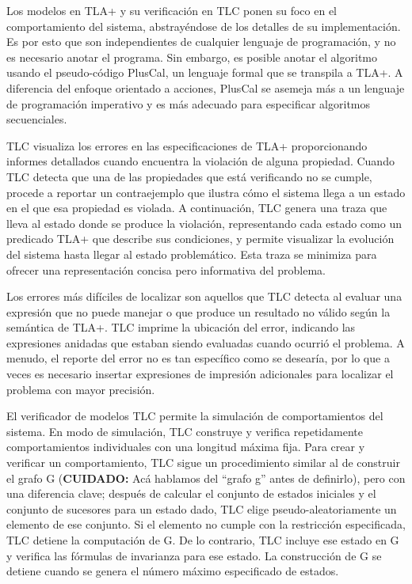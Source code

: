 \documentclass[runningheads]{llncs}
\begin{document}
Los modelos en TLA+ y su verificación en TLC ponen su foco en el comportamiento del sistema, abstrayéndose de los detalles de su implementación. Es por esto que son independientes de cualquier lenguaje de programación, y no es necesario anotar el programa. Sin embargo, es posible anotar el algoritmo usando el pseudo-código PlusCal, un lenguaje formal que se transpila a TLA+. A diferencia del enfoque orientado a acciones, PlusCal se asemeja más a un lenguaje de programación imperativo y es más adecuado para especificar algoritmos secuenciales.

TLC visualiza los errores en las especificaciones de TLA+ proporcionando informes detallados cuando encuentra la violación de alguna propiedad. Cuando TLC detecta que una de las propiedades que está verificando no se cumple, procede a reportar un contraejemplo que ilustra cómo el sistema llega a un estado en el que esa propiedad es violada. A continuación, TLC genera una traza que lleva al estado donde se produce la violación, representando cada estado como un predicado TLA+ que describe sus condiciones, y permite visualizar la evolución del sistema hasta llegar al estado problemático. Esta traza se minimiza para ofrecer una representación concisa pero informativa del problema. 

Los errores más difíciles de localizar son aquellos que TLC detecta al evaluar una expresión que no puede manejar o que produce un resultado no válido según la semántica de TLA+. TLC imprime la ubicación del error, indicando las expresiones anidadas que estaban siendo evaluadas cuando ocurrió el problema. A menudo, el reporte del error no es tan específico como se desearía, por lo que a veces es necesario insertar expresiones de impresión adicionales para localizar el problema con mayor precisión.

El verificador de modelos TLC permite la simulación de comportamientos del sistema. En modo de simulación, TLC construye y verifica repetidamente comportamientos individuales con una longitud máxima fija.
Para crear y verificar un comportamiento, TLC sigue un procedimiento similar al de construir el grafo G (\textbf{CUIDADO:} Acá hablamos del “grafo g” antes de definirlo), pero con una diferencia clave; después de calcular el conjunto de estados iniciales y el conjunto de sucesores para un estado dado, TLC elige pseudo-aleatoriamente un elemento de ese conjunto. Si el elemento no cumple con la restricción especificada, TLC detiene la computación de G. De lo contrario, TLC incluye ese estado en G y verifica las fórmulas de invarianza para ese estado. La construcción de G se detiene cuando se genera el número máximo especificado de estados.
\end{document}
